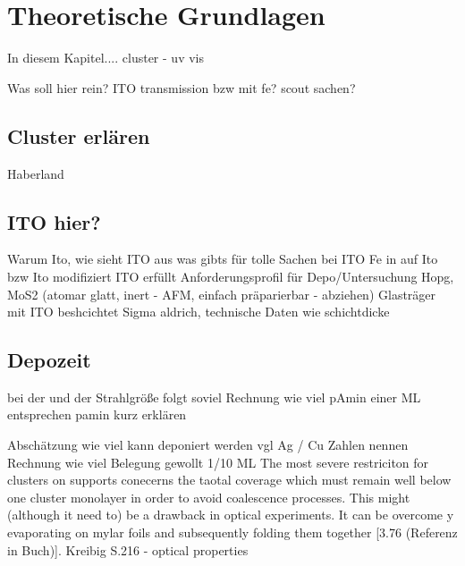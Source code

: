 \chapter{Theoretische Grundlagen}
In diesem Kapitel....
cluster - \cite{haberland}
uv vis \cite{kreibig}

Was soll hier rein? ITO transmission bzw mit fe? scout sachen?

\section{Cluster erlären}
Haberland
\section{ITO hier?}
Warum Ito, wie sieht ITO aus
was gibts für tolle Sachen  bei ITO
Fe in auf Ito bzw Ito modifiziert
ITO erfüllt Anforderungsprofil für Depo/Untersuchung
Hopg, MoS2 (atomar glatt, inert - AFM, einfach präparierbar - abziehen)
Glasträger mit ITO beshcichtet Sigma aldrich, technische Daten wie schichtdicke
\section{Depozeit}
\label{sec:depo}
bei der und der Strahlgröße folgt soviel 
Rechnung wie viel pAmin einer ML entsprechen
pamin kurz erklären




Abschätzung wie viel kann deponiert werden vgl Ag / Cu Zahlen nennen
Rechnung wie viel Belegung gewollt 1/10 ML
The most severe restriciton for clusters on supports conecerns the taotal coverage which must remain well below one cluster monolayer in order to avoid coalescence processes.
This might (although it need to) be a drawback in optical experiments.
It can be overcome y evaporating on mylar foils and subsequently folding them together [3.76 (Referenz in Buch)].
Kreibig \cite[S.216]{Kreibig.1995} S.216 - optical properties

